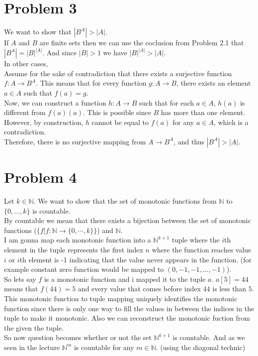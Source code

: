 \documentclass{article}
\begin{document}
\section*{Problem 3}
We want to show that \(|B^A| > |A|\).\\
If \(A\) and \(B\) are finite sets then we can use the coclusion from Problem 2.1 that \(|B^A| = |B|^{|A|}\). And since \(|B| > 1\) we have \(|B|^{|A|} > |A|\).\\
In other cases, \\
Assume for the sake of contradiction that there exists a surjective function \( f: A \to B^A \). This means that for every function \( g: A \to B \), there exists an element \( a \in A \) such that \( f(a) = g \).\\
Now, we can construct a function \( h: A \to B \) such that for each \( a \in A \), \( h(a) \) is different from \( f(a)(a) \). This is possible since \( B \) has more than one element.\\
However, by construction, \( h \) cannot be equal to \( f(a) \) for any \( a \in A \), which is a contradiction.\\
Therefore, there is no surjective mapping from \( A \to B^A \), and thus \(|B^A| > |A|\).

\section*{Problem 4}
Let \( k \in \mathbb{N} \). We want to show that the set of monotonic functions from \( \mathbb{N} \) to \( \{0, \ldots, k\} \) is countable.\\
By countable we mean that there exists a bijection between the set of monotonic functions (\(\{f | f: \mathbb{N} \rightarrow \{0, \cdots, k\}\}\)) and \( \mathbb{N} \).\\
I am gonna map each monotonic function into a \(\mathbb{N}^{k+1}\) tuple where the \(i\)th element in the tuple represents the first index \(n\) where the function reaches value \(i\)
or \(i\)th element is -1 indicating that the value never appears in the function. (for example constant zero function would be mapped to \((0, -1, -1, ..., -1)\)).\\
So lets say \(f\) is a monotonic function and i mapped it to the tuple \(a\). \(a[5] = 44\) means that \(f(44) = 5\) and every value that comes before index \(44\) is less than \(5\).
This monotonic function to tuple mapping uniquely identifies the monotonic function since there is only one way to fill the values in between the indices in the tuple to make it monotonic.
Also we can reconstruct the monotonic fuction from the given the tuple. \\
So now question becomes whether or not the set \(\mathbb{N}^{k+1}\) is countable. And as we seen in the lecture \(\mathbb{N}^m\) is countable for any \(m \in \mathbb{N}\). (using the diagonal technic)\\
\end{document}
